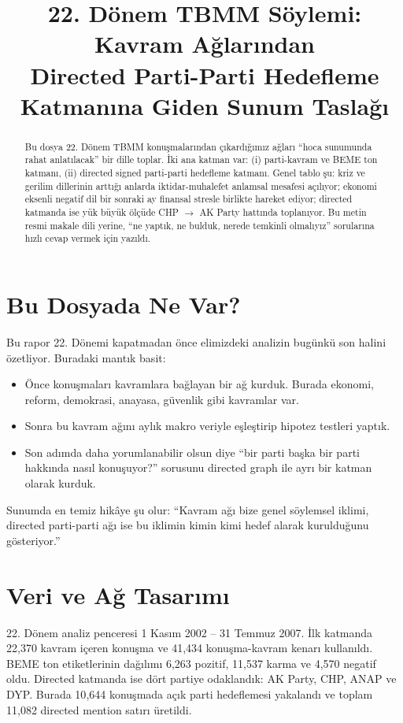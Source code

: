 \documentclass[conference]{IEEEtran}
\title{22. D\"onem TBMM S\"oylemi: Kavram A\u{g}lar{\i}ndan\\ Directed Parti-Parti Hedefleme Katman{\i}na Giden Sunum Tasla\u{g}{\i}}
\author{
\IEEEauthorblockN{Selman Y{\i}lmaz}
\IEEEauthorblockA{PoliEcoTRNetworSci\\
Sunum ama\c{c}l{\i} a\c{c}{\i}klay{\i}c{\i} rapor tasla\u{g}{\i}}
}
\begin{document}
\maketitle

\begin{abstract}
Bu dosya 22. D\"onem TBMM konu\c{s}malar{\i}ndan \c{c}{\i}kard{\i}\u{g}{\i}m{\i}z a\u{g}lar{\i} ``hoca sunumunda rahat anlat{\i}lacak'' bir dille toplar. \.{I}ki ana katman var: (i) parti-kavram ve BEME ton katman{\i}, (ii) directed signed parti-parti hedefleme katman{\i}. Genel tablo \c{s}u: kriz ve gerilim dillerinin artt{\i}\u{g}{\i} anlarda iktidar-muhalefet anlamsal mesafesi a\c{c}{\i}l{\i}yor; ekonomi eksenli negatif dil bir sonraki ay finansal stresle birlikte hareket ediyor; directed katmanda ise y\"uk b\"uy\"uk \"ol\c{c}\"ude CHP $\rightarrow$ AK Party hatt{\i}nda toplan{\i}yor. Bu metin resmi makale dili yerine, ``ne yapt{\i}k, ne bulduk, nerede temkinli olmal{\i}y{\i}z'' sorular{\i}na h{\i}zl{\i} cevap vermek i\c{c}in yaz{\i}ld{\i}.
\end{abstract}

\section{Bu Dosyada Ne Var?}
Bu rapor 22. D\"onemi kapatmadan \"once elimizdeki analizin bug\"unk\"u son halini \"ozetliyor. Buradaki mant{\i}k basit:
\begin{itemize}
\item \"Once konu\c{s}malar{\i} kavramlara ba\u{g}layan bir a\u{g} kurduk. Burada ekonomi, reform, demokrasi, anayasa, g\"uvenlik gibi kavramlar var.
\item Sonra bu kavram a\u{g}{\i}n{\i} ayl{\i}k makro veriyle e\c{s}le\c{s}tirip hipotez testleri yapt{\i}k.
\item Son ad{\i}mda daha yorumlanabilir olsun diye ``bir parti ba\c{s}ka bir parti hakk{\i}nda nas{\i}l konu\c{s}uyor?'' sorusunu directed graph ile ayr{\i} bir katman olarak kurduk.
\end{itemize}

Sunumda en temiz hik\^aye \c{s}u olur: ``Kavram a\u{g}{\i} bize genel s\"oylemsel iklimi, directed parti-parti a\u{g}{\i} ise bu iklimin kimin kimi hedef alarak kuruldu\u{g}unu g\"osteriyor.''

\section{Veri ve A\u{g} Tasar{\i}m{\i}}
22. D\"onem analiz penceresi 1 Kas{\i}m 2002 -- 31 Temmuz 2007. \.{I}lk katmanda 22{,}370 kavram i\c{c}eren konu\c{s}ma ve 41{,}434 konu\c{s}ma-kavram kenar{\i} kullan{\i}ld{\i}. BEME ton etiketlerinin da\u{g}{\i}l{\i}m{\i} 6{,}263 pozitif, 11{,}537 karma ve 4{,}570 negatif oldu. Directed katmanda ise d\"ort partiye odakland{\i}k: AK Party, CHP, ANAP ve DYP. Burada 10{,}644 konu\c{s}mada a\c{c}{\i}k parti hedeflemesi yakaland{\i} ve toplam 11{,}082 directed mention sat{\i}r{\i} \"uretildi.
\end{document}
